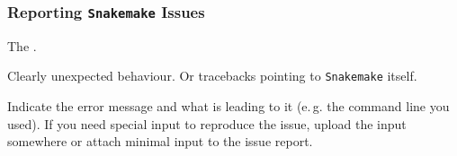 \begin{frame}
  \frametitle{Reporting \texttt{Snakemake} Issues}
  \begin{question}[Where to?]
  	 The .
  \end{question}	
  \pause
  \begin{question}[What?]
  	Clearly unexpected behaviour. Or tracebacks pointing to \texttt{Snakemake} itself. 
  \end{question}
  \pause
  \begin{question}[How?]
  	Indicate the error message and what is leading to it (e.\,g. the command line you used). If you need special input to reproduce the issue, upload the input somewhere or attach minimal input to the issue report.
  \end{question}
\end{frame}

